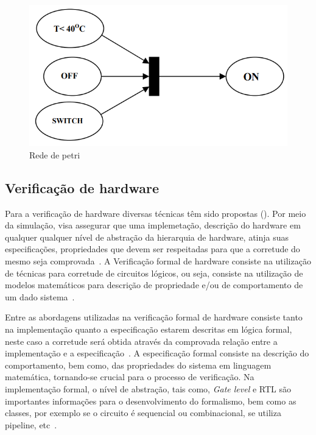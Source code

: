 \begin{figure}[htb]
	\begin{center}
    \caption{\label{fig:rede_petri}Rede de petri}
	\includegraphics[scale=0.40]{Figuras/rede_petri.png}
	\end{center}
\end{figure}



\subsection{Verificação de hardware}

Para a verificação de hardware diversas técnicas têm sido propostas (). Por meio da simulação, visa assegurar que uma implemetação, descrição do hardware em qualquer qualquer nível de abstração da hierarquia de hardware, atinja suas especificações, propriedades que devem ser respeitadas para que a corretude do mesmo seja comprovada~\cite{gupta1992formal}. A Verificação formal de hardware consiste na utilização 
de técnicas para corretude de circuitos lógicos, ou seja, consiste na utilização de modelos matemáticos para descrição de propriedade e/ou de comportamento de um dado sistema~\cite{kropf2013introduction}.

\par
Entre as abordagens utilizadas na verificação formal de hardware consiste tanto na implementação quanto a especificação estarem descritas em lógica formal, neste caso a corretude será obtida através da comprovada relação entre a implementação e a especificação~\cite{seger1992introduction}. A especificação formal consiste na descrição do comportamento, bem como, das propriedades do sistema em linguagem matemática, tornando-se crucial para o processo de verificação. Na implementação formal, o nível de abstração, tais como, \textit{Gate level} e RTL são importantes informações para o desenvolvimento do formalismo, bem como as classes, por exemplo se o circuito é sequencial ou combinacional, se utiliza pipeline, etc~\cite{kropf2013introduction}.

